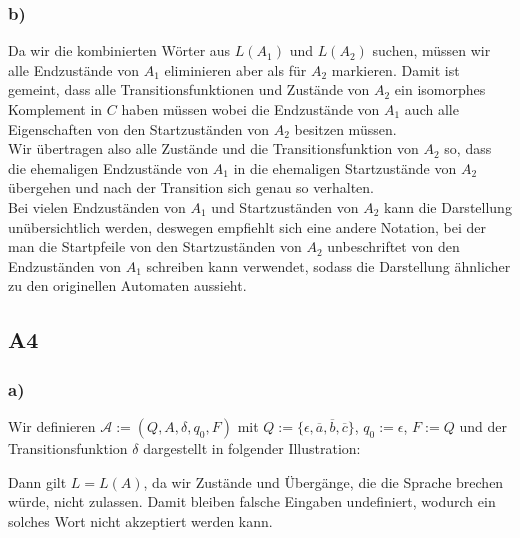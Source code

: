 \documentclass[12pt, a4paper]{article}
\begin{document}
\subsubsection*{b)}
Da wir die kombinierten Wörter aus \(L(A_1)\) und \(L(A_2)\) suchen, müssen wir alle Endzustände von \(A_1\) eliminieren aber als   für \(A_2\) markieren. Damit ist gemeint, dass alle Transitionsfunktionen und Zustände von \(A_2\) ein isomorphes Komplement in \(C\) haben müssen wobei die Endzustände von \(A_1\) auch alle Eigenschaften von den Startzuständen von \(A_2\) besitzen müssen. \\
Wir übertragen also alle Zustände und die Transitionsfunktion von \(A_2\) so, dass die ehemaligen Endzustände von \(A_1\) in die ehemaligen Startzustände von \(A_2\) übergehen und nach der Transition sich genau so verhalten. \\
Bei vielen Endzuständen von \(A_1\) und Startzuständen von \(A_2\) kann die Darstellung unübersichtlich werden, deswegen empfiehlt sich eine andere Notation, bei der man die Startpfeile von den Startzuständen von \(A_2\) unbeschriftet von den Endzuständen von \(A_1\) schreiben kann verwendet, sodass die Darstellung ähnlicher zu den originellen Automaten aussieht. \pagebreak
\subsection*{A4}
\subsubsection*{a)}
Wir definieren \(\mathcal A := (Q, A, \delta, q_0, F)\) mit \(Q := \{\epsilon, \overline{a}, \overline{b}, \overline{c}\}\), \(q_0 := \epsilon\), \(F := Q\) und der Transitionsfunktion \(\delta\) dargestellt in folgender Illustration:
\begin{center}
\end{center}
Dann gilt \(L = L(A)\), da wir Zustände und Übergänge, die die Sprache brechen würde, nicht zulassen. Damit bleiben falsche Eingaben undefiniert, wodurch ein solches Wort nicht akzeptiert werden kann. 
\end{document}
